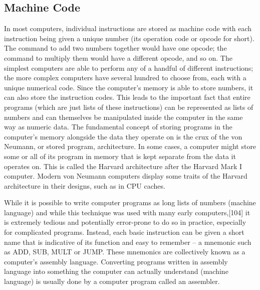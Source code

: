 \documentclass[a4paper,11pt]{IEEEtran}
\begin{document}
\subsection{Machine Code}
In most computers, individual instructions are stored as machine code with each instruction being given a unique number (its operation code or opcode for short). The command to add two numbers together would have one opcode; the command to multiply them would have a different opcode, and so on. The simplest computers are able to perform any of a handful of different instructions; the more complex computers have several hundred to choose from, each with a unique numerical code. Since the computer's memory is able to store numbers, it can also store the instruction codes. This leads to the important fact that entire programs (which are just lists of these instructions) can be represented as lists of numbers and can themselves be manipulated inside the computer in the same way as numeric data. The fundamental concept of storing programs in the computer's memory alongside the data they operate on is the crux of the von Neumann, or stored program, architecture. In some cases, a computer might store some or all of its program in memory that is kept separate from the data it operates on. This is called the Harvard architecture after the Harvard Mark I computer. Modern von Neumann computers display some traits of the Harvard architecture in their designs, such as in CPU caches.

While it is possible to write computer programs as long lists of numbers (machine language) and while this technique was used with many early computers,[104] it is extremely tedious and potentially error-prone to do so in practice, especially for complicated programs. Instead, each basic instruction can be given a short name that is indicative of its function and easy to remember – a mnemonic such as ADD, SUB, MULT or JUMP. These mnemonics are collectively known as a computer's assembly language. Converting programs written in assembly language into something the computer can actually understand (machine language) is usually done by a computer program called an assembler. 
\end{document}
